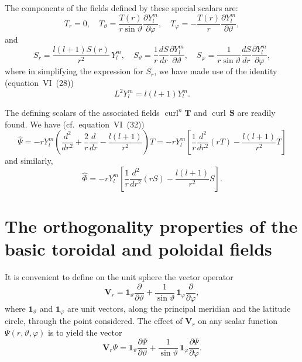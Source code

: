 The components of the fields defined by these special scalars are:
\begin{equation}
\label{eq:A3-15}
T_r = 0, \quad T_\vartheta = \frac{T(r)}{r\sin\vartheta}\frac{\partial Y_l^m}{\partial\varphi}, \quad T_\varphi = -\frac{T(r)}{r}\frac{\partial Y_l^m}{\partial\vartheta},
\end{equation}
and
\begin{equation}
\label{eq:A3-16}
S_r = \frac{l(l+1) S(r)}{r^2}\,Y_l^m, \quad S_\vartheta = \frac{1}{r}\frac{dS}{dr}\frac{\partial Y_l^m}{\partial\vartheta}, \quad S_\varphi = \frac{1}{r\sin\vartheta}\frac{dS}{dr}\frac{\partial Y_l^m}{\partial\varphi},
\end{equation}
where in simplifying the expression for $S_r$, we have made use of the identity (equation~VI~(28))
\begin{equation}
\label{eq:A3-17}
L^2 Y_l^m = l(l+1) Y_l^m.
\end{equation}

The defining scalars of the associated fields $\operatorname{curl}^n\mathbf{T}$ and $\operatorname{curl}\,\mathbf{S}$ are readily found. We have (cf.\ equation~VI~(32))
\begin{equation}
\label{eq:A3-18}
\hat{\Psi} = -r Y_l^m \left(\frac{d^2}{dr^2} + \frac{2}{r}\frac{d}{dr} - \frac{l(l+1)}{r^2}\right)T = -r Y_l^m \left[\frac{1}{r}\frac{d^2}{dr^2}(rT) - \frac{l(l+1)}{r^2}T\right]
\end{equation}
and similarly,
\begin{equation}
\label{eq:A3-19}
\hat{\Phi} = -r Y_l^m \left[\frac{1}{r}\frac{d^2}{dr^2}(rS) - \frac{l(l+1)}{r^2}S\right].
\end{equation}

\section{The orthogonality properties of the basic toroidal and poloidal fields}\label{sec:129}

It is convenient to define on the unit sphere the vector operator
\begin{equation}
\label{eq:A3-20}
\mathbf{V}_r = \mathbf{1}_\vartheta \frac{\partial}{\partial\vartheta} + \frac{1}{\sin\vartheta}\,\mathbf{1}_\varphi \frac{\partial}{\partial\varphi},
\end{equation}
where $\mathbf{1}_\vartheta$ and $\mathbf{1}_\varphi$ are unit vectors, along the principal meridian and the latitude circle, through the point considered. The effect of $\mathbf{V}_r$ on any scalar function $\Psi(r, \vartheta, \varphi)$ is to yield the vector
\begin{equation}
\label{eq:A3-21}
\mathbf{V}_r \Psi = \mathbf{1}_\vartheta \frac{\partial\Psi}{\partial\vartheta} + \frac{1}{\sin\vartheta}\,\mathbf{1}_\varphi \frac{\partial\Psi}{\partial\varphi}.
\end{equation}

